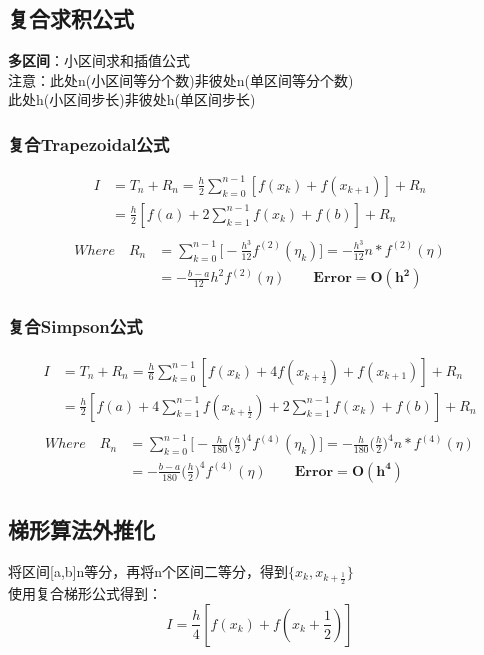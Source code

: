 \documentclass[12pt]{article}
\begin{document}
\begin{CJK*}{UTF8}{gbsn}
\begin{spacing}{1.5}
\newpage
\subsection{复合求积公式}
\textbf{多区间}：小区间求和插值公式\\
注意：此处n(小区间等分个数)非彼处n(单区间等分个数)\\
      此处h(小区间步长)非彼处h(单区间步长)\\
\subsubsection{复合Trapezoidal公式}
    $$
    \begin{aligned}
        I &= T_n + R_n = \frac{h}{2}\sum_{k=0}^{n-1}[f(x_k) + f(x_{k+1})] + R_n \\
          &= \frac{h}{2}[f(a) + 2\sum_{k=1}^{n-1}f(x_k) + f(b)] + R_n\\
    \end{aligned}
    $$
    $$
    \begin{aligned}
        Where \quad R_n &= \sum_{k=0}^{n-1}\big[-\frac{h^3}{12}f^{(2)}(\eta_k)\big] = -\frac{h^3}{12}n*f^{(2)}(\eta) \\
        &= -\frac{b-a}{12}h^2f^{(2)}(\eta) \qquad \boldsymbol{Error = O(h^2)}
    \end{aligned} 
    $$
    
\subsubsection{复合Simpson公式}
    $$
    \begin{aligned}
        I &= T_n + R_n = \frac{h}{6}\sum_{k=0}^{n-1}[f(x_k)+ 4f(x_{k+\frac{1}{2}}) + f(x_{k+1})] + R_n \\
          &= \frac{h}{2}[f(a) + 4\sum_{k=1}^{n-1}f(x_{k+\frac{1}{2}}) + 2\sum_{k=1}^{n-1}f(x_k) + f(b)] + R_n\\
    \end{aligned}
    $$
    $$
    \begin{aligned}
        Where \quad R_n &= \sum_{k=0}^{n-1}\big[-\frac{h}{180}\big(\frac{h}{2}\big)^4f^{(4)}(\eta_k)\big] = -\frac{h}{180}\big(\frac{h}{2}\big)^4n*f^{(4)}(\eta) \\
        &= -\frac{b-a}{180}\big(\frac{h}{2}\big)^4f^{(4)}(\eta) \qquad \boldsymbol{Error = O(h^4)}
    \end{aligned}
    $$
    
\newpage
\subsection{梯形算法外推化}
        将区间[a,b]n等分，再将n个区间二等分，得到$\{x_k,x_{k +\frac{1}{2}}\}$ \\
        使用复合梯形公式得到：
        \[
            I = \frac{h}{4}[f(x_k) + f(x_k+\frac{1}{2})]
        \]   

\end{spacing}
\end{CJK*}
\end{document}
